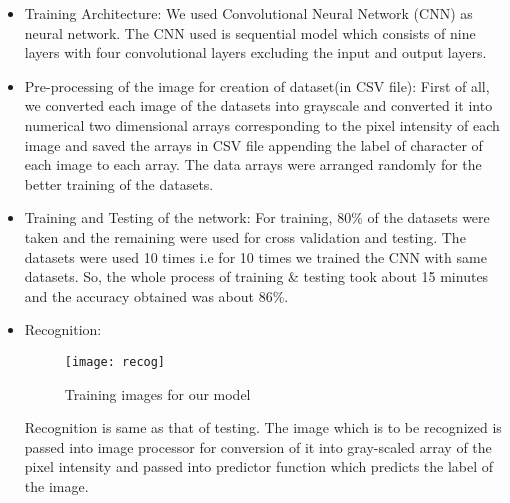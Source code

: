 \begin{itemize}
    \item Training Architecture:
We used Convolutional Neural Network (CNN) as neural network. The CNN used is sequential model which consists of nine layers with four convolutional layers excluding the input and output layers.
    \item Pre-processing of the image for creation of dataset(in CSV file):
First of all, we converted each image of the datasets into grayscale and converted it into numerical two dimensional arrays corresponding to the pixel intensity of each image and saved the arrays in CSV file appending the label of character of each image to each array. The data arrays were arranged randomly for the better training of the datasets.
    \item Training and Testing of the network:
For training, 80\% of the datasets were taken and the remaining were used for cross validation and testing. The datasets were used 10 times i.e for 10 times we trained the CNN with same datasets. So, the whole process of training \& testing took about 15 minutes and the accuracy obtained was about 86\%.   
    \item Recognition:
\begin{figure}[htb]
\centering
\texttt{[image: recog]}
\caption{Training images for our model}
\end{figure}

Recognition is same as that of testing. The image which is to be recognized is passed into image processor for conversion of it into gray-scaled array of the pixel intensity and passed into predictor function which predicts the label of the image.
\end{itemize}






